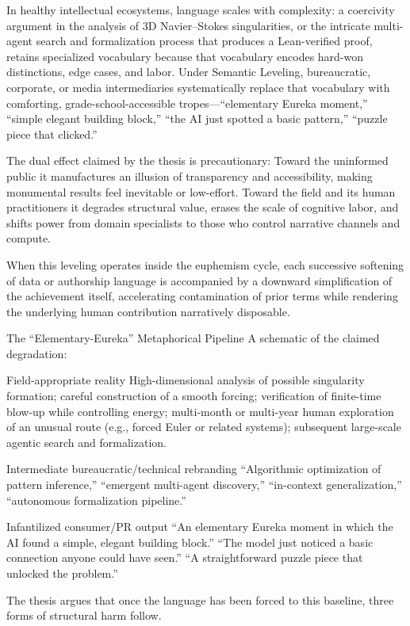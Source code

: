 In healthy intellectual ecosystems, language scales with complexity: a coercivity argument in the analysis of 3D Navier–Stokes singularities, or the intricate multi-agent search and formalization process that produces a Lean-verified proof, retains specialized vocabulary because that vocabulary encodes hard-won distinctions, edge cases, and labor. Under Semantic Leveling, bureaucratic, corporate, or media intermediaries systematically replace that vocabulary with comforting, grade-school-accessible tropes—“elementary Eureka moment,” “simple elegant building block,” “the AI just spotted a basic pattern,” “puzzle piece that clicked.”  

The dual effect claimed by the thesis is precautionary:
Toward the uninformed public it manufactures an illusion of transparency and accessibility, making monumental results feel inevitable or low-effort.
Toward the field and its human practitioners it degrades structural value, erases the scale of cognitive labor, and shifts power from domain specialists to those who control narrative channels and compute.

When this leveling operates inside the euphemism cycle, each successive softening of data or authorship language is accompanied by a downward simplification of the achievement itself, accelerating contamination of prior terms while rendering the underlying human contribution narratively disposable.

The “Elementary-Eureka” Metaphorical Pipeline
A schematic of the claimed degradation:

Field-appropriate reality  
High-dimensional analysis of possible singularity formation; careful construction of a smooth forcing; verification of finite-time blow-up while controlling energy; multi-month or multi-year human exploration of an unusual route (e.g., forced Euler or related systems); subsequent large-scale agentic search and formalization.

Intermediate bureaucratic/technical rebranding  
“Algorithmic optimization of pattern inference,” “emergent multi-agent discovery,” “in-context generalization,” “autonomous formalization pipeline.”

Infantilized consumer/PR output  
“An elementary Eureka moment in which the AI found a simple, elegant building block.”  
“The model just noticed a basic connection anyone could have seen.”  
“A straightforward puzzle piece that unlocked the problem.”

The thesis argues that once the language has been forced to this baseline, three forms of structural harm follow.

